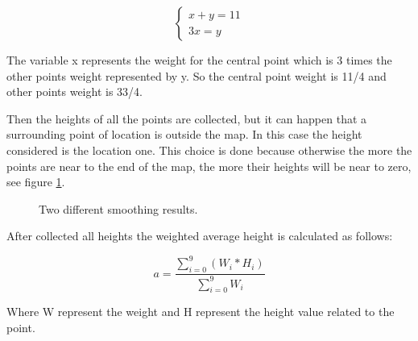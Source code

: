 \documentclass[12pt]{article}
\begin{document}
    \begin{equation}
        \begin{cases}
            x + y = 11
            \\ 3x = y
        \end{cases}
    \end{equation}

    \noindent
    The variable x represents the weight for the central point which is 3 times the other points weight represented by y. So the central point weight is 11/4 and other points weight is 33/4.

    Then the heights of all the points are collected, but it can happen that a surrounding point of location is outside the map. In this case the height considered  is the location one. 
    This choice is done because otherwise the more the points are near to the end of the map, the more their heights will be near to zero, see figure \ref{fig:SmotthingCamparison}.
    
    \begin{figure}
        \centering     %
        \caption{Two different smoothing results.}
        \label{fig:SmotthingCamparison}
    \end{figure}
        
    
    After collected all heights the weighted average height is calculated as follows:

    \begin{equation}
        a = \dfrac{\sum\limits_{i=0}^{9} (W_i * H_i) }{ \sum\limits_{i=0}^{9} W_i }
    \end{equation}

    \noindent
    Where W represent the weight and H represent the height value related to the point. 
\end{document}
